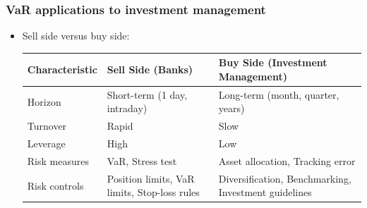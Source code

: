 \subsubsection{VaR applications to investment management}
\begin{itemize}
\item Sell side versus buy side:

\begin{tabular}{@{}l l l @{}}
    \toprule
    Characteristic & Sell Side (Banks) & Buy Side (Investment Management) \\
    \midrule
    Horizon & Short-term (1 day, intraday) & Long-term (month, quarter, years) \\
    Turnover & Rapid & Slow \\
    Leverage & High & Low \\
    Risk measures & VaR, Stress test & Asset allocation, Tracking error \\
    Risk controls & Position limits, VaR limits, Stop-loss rules & Diversification, Benchmarking, Investment guidelines \\
    \bottomrule
\end{tabular}


\end{itemize}

